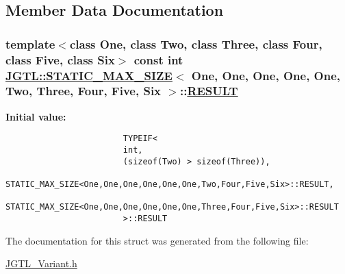 \subsection{Member Data Documentation}
\hypertarget{struct_j_g_t_l_1_1_s_t_a_t_i_c___m_a_x___s_i_z_e_3_01_one_00_01_one_00_01_one_00_01_one_00_01_on9f6e865142ccd9af848bb97d1dbfdb72_a38f542b3bab6ed4663e92dc94693ca7}{
\subsubsection[RESULT]{\setlength{\rightskip}{0pt plus 5cm}template$<$class One, class Two, class Three, class Four, class Five, class Six$>$ const int \hyperlink{struct_j_g_t_l_1_1_s_t_a_t_i_c___m_a_x___s_i_z_e}{JGTL::STATIC\_\-MAX\_\-SIZE}$<$ One, One, One, One, One, Two, Three, Four, Five, Six $>$::\hyperlink{struct_j_g_t_l_1_1_s_t_a_t_i_c___m_a_x___s_i_z_e_3_01_one_00_01_one_00_01_one_00_01_one_00_01_on9f6e865142ccd9af848bb97d1dbfdb72_a38f542b3bab6ed4663e92dc94693ca7}{RESULT}}}
\label{struct_j_g_t_l_1_1_s_t_a_t_i_c___m_a_x___s_i_z_e_3_01_one_00_01_one_00_01_one_00_01_one_00_01_on9f6e865142ccd9af848bb97d1dbfdb72_a38f542b3bab6ed4663e92dc94693ca7}


\textbf{Initial value:}

\begin{Code}\begin{verbatim}
                        TYPEIF<
                        int,
                        (sizeof(Two) > sizeof(Three)),
                        STATIC_MAX_SIZE<One,One,One,One,One,One,Two,Four,Five,Six>::RESULT,
                        STATIC_MAX_SIZE<One,One,One,One,One,One,Three,Four,Five,Six>::RESULT
                        >::RESULT
\end{verbatim}\end{Code}


The documentation for this struct was generated from the following file:\begin{CompactItemize}
\item 
\hyperlink{_j_g_t_l___variant_8h}{JGTL\_\-Variant.h}\end{CompactItemize}
